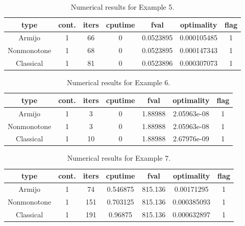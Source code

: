 \documentclass[a4paper]{article}
\begin{document}
  \begin{table}[p]
    \centering
    \begin{tabular}{cc|ccccc}
      \hline
      type & cont. & iters & cputime & 
      fval & optimality & flag \\ \hline
      Armijo & 1 & 66 & 0 & 0.0523895 & 0.000105485 & 1 \\
      Nonmonotone & 1 & 68 & 0 & 0.0523895 & 0.000147343 & 1 \\
      Classical & 1 & 81 & 0 & 0.0523896 & 0.000307073 & 1 \\
      \hline
    \end{tabular}
    \caption{Numerical results for Example 5.}
    \label{tab5}
  \end{table}
  
  
  
  
  \begin{table}[p]
    \centering
    \begin{tabular}{cc|ccccc}
      \hline
      type & cont. & iters & cputime & 
      fval & optimality & flag \\ \hline
      Armijo & 1 & 3 & 0 & 1.88988 & 2.05963e-08 & 1 \\
      Nonmonotone & 1 & 3 & 0 & 1.88988 & 2.05963e-08 & 1 \\
      Classical & 1 & 10 & 0 & 1.88988 & 2.67976e-09 & 1 \\
      \hline
    \end{tabular}
    \caption{Numerical results for Example 6.}
    \label{tab6}
  \end{table}
  
  
  
  \begin{table}[p]
    \centering
    \begin{tabular}{cc|ccccc}
      \hline
      type & cont. & iters & cputime & 
      fval & optimality & flag \\ \hline
      Armijo & 1 & 74 & 0.546875 & 815.136 & 0.00171295 & 1 \\
      Nonmonotone & 1 & 151 & 0.703125 & 815.136 & 0.000385093 & 1 \\
      Classical & 1 & 191 & 0.96875 & 815.136 & 0.000632897 & 1 \\
      \hline
    \end{tabular}
    \caption{Numerical results for Example 7.}
    \label{tab7}
  \end{table}
  
  
  
\end{document}
